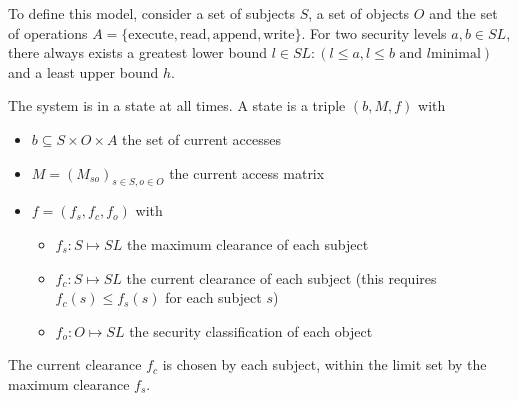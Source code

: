To define this model, consider a set of subjects $S$, a set of objects $O$ and
the set of operations $A = \{\text{execute}, \text{read}, \text{append},
\text{write}\}$. For two security levels $a, b \in SL$, there always exists a
greatest lower bound $l \in SL: (l \leq a, l \leq b \text{ and } l
\text{minimal})$ and a least upper bound $h$.

The system is in a state at all times. A state is a triple $(b, M, f)$ with
\begin{itemize}
    \item $b \subseteq S \times O \times A$ the set of current accesses
    \item $M = (M_{so})_{s\in S, o\in O}$ the current access matrix
    \item $f = (f_s, f_c, f_o)$ with
          \begin{itemize}
              \item $f_s: S \mapsto SL$ the maximum clearance of each subject
              \item $f_c: S \mapsto SL$ the current clearance of each subject
                    (this requires $f_c(s) \leq f_s(s)$ for each subject $s$)
              \item $f_o: O \mapsto SL$ the security classification of each
                    object
          \end{itemize}
\end{itemize}

The current clearance $f_c$ is chosen by each subject, within the limit set by
the maximum clearance $f_s$.

